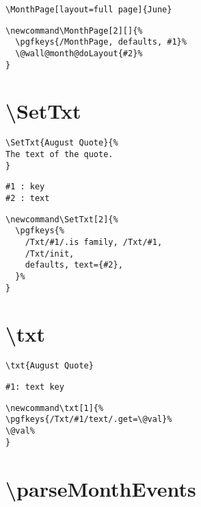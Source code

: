 \documentclass[11pt,oneside]{memoir-article}
\begin{document}
\begin{verbatim}
\MonthPage[layout=full page]{June}
\end{verbatim}

\begin{verbatim}
\newcommand\MonthPage[2][]{%
  \pgfkeys{/MonthPage, defaults, #1}%
  \@wall@month@doLayout{#2}%
}
\end{verbatim}

\section{\textbackslash SetTxt}
\label{sec:org39e78f0}

\begin{verbatim}
\SetTxt{August Quote}{%
The text of the quote.
}
\end{verbatim}

\begin{verbatim}
#1 : key
#2 : text
\end{verbatim}

\begin{verbatim}
\newcommand\SetTxt[2]{%
  \pgfkeys{%
    /Txt/#1/.is family, /Txt/#1,
    /Txt/init,
    defaults, text={#2},
  }%
}
\end{verbatim}

\section{\textbackslash txt}
\label{sec:org2018789}

\begin{verbatim}
\txt{August Quote}
\end{verbatim}

\begin{verbatim}
#1: text key
\end{verbatim}

\begin{verbatim}
\newcommand\txt[1]{%
\pgfkeys{/Txt/#1/text/.get=\@val}%
\@val%
}
\end{verbatim}

\section{\textbackslash parseMonthEvents}
\label{sec:orgaae8f87}
\end{document}
